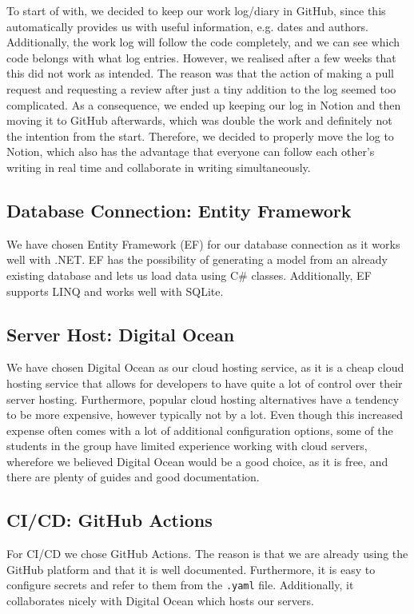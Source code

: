 To start of with, we decided to keep our work log/diary in GitHub, since this automatically provides us with useful information, e.g. dates and authors. Additionally, the work log will follow the code completely, and we can see which code belongs with what log entries. However, we realised after a few weeks that this did not work as intended. The reason was that the action of making a pull request and requesting a review after just a tiny addition to the log seemed too complicated.
As a consequence, we ended up keeping our log in Notion and then moving it to GitHub afterwards, which was double the work and definitely not the intention from the start.
Therefore, we decided to properly move the log to Notion, which also has the advantage that everyone can follow each other's writing in real time and collaborate in writing simultaneously.

\subsection{Database Connection: Entity Framework}

We have chosen Entity Framework (EF) for our database connection as it works well with .NET. EF has the possibility of generating a model from an already existing database and lets us load data using C\# classes. Additionally, EF supports LINQ and works well with SQLite.

\subsection{Server Host: Digital Ocean}

We have chosen Digital Ocean as our cloud hosting service, as it is a cheap cloud hosting service that allows for developers to have quite a lot of control over their server hosting. Furthermore, popular cloud hosting alternatives have a tendency to be more expensive, however typically not by a lot. Even though this increased expense often comes with a lot of additional configuration options, some of the students in the group have limited experience working with cloud servers, wherefore we believed Digital Ocean would be a good choice, as it is free, and there are plenty of guides and good documentation.

\subsection{CI/CD: GitHub Actions}

For CI/CD we chose GitHub Actions. The reason is that we are already using the GitHub platform and that it is well documented. Furthermore, it is easy to configure secrets and refer to them from the \texttt{.yaml} file. Additionally, it collaborates nicely with Digital Ocean which hosts our servers.

